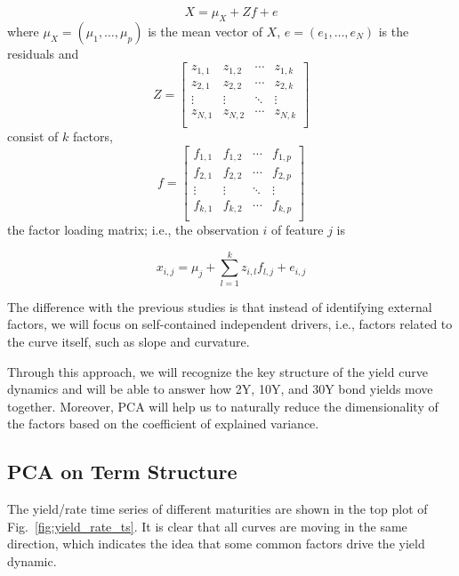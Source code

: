 \begin{equation}
X = \mu_ X + Zf + e
\end{equation}
\noindent
where $\mu_X = (\mu_1,\ldots, \mu_p)$ is the mean vector of $X$, $e = (e_1,\ldots, e_N )$ is the residuals and
\begin{equation}
Z =
\begin{bmatrix}
	z_{1,1} & z_{1,2} & \cdots & z_{1,k} \\
	z_{2,1} & z_{2,2} & \cdots & z_{2,k} \\
	\vdots & \vdots & \ddots & \vdots \\
	z_{N,1} & z_{N,2} & \cdots & z_{N,k} \\
\end{bmatrix}
\end{equation}
consist of $k$ factors,
\begin{equation}
f =
\begin{bmatrix}
	f_{1,1} & f_{1,2} & \cdots & f_{1,p} \\
	f_{2,1} & f_{2,2} & \cdots & f_{2,p} \\
	\vdots & \vdots & \ddots & \vdots \\
	f_{k,1} & f_{k,2} & \cdots & f_{k,p} \\
\end{bmatrix}
\end{equation}
the factor loading matrix; i.e., the observation $i$ of feature $j$ is

\begin{equation}
x_{i,j} = \mu_j + \sum_{l=1}^k z_{i,l}f_{l,j} + e_{i,j}
\end{equation}

The difference with the previous studies is that instead of identifying external factors, we will focus on self-contained independent drivers, i.e., factors related to the curve itself, such as slope and curvature.

Through this approach, we will recognize the key structure of the yield curve dynamics and will be able to answer how 2Y, 10Y, and 30Y bond yields move together. Moreover, PCA will help us to naturally reduce the dimensionality of the factors based on the coefficient of explained variance.

\subsection{PCA on Term Structure}

The yield/rate time series of different maturities are shown in the top plot of Fig.~\ref{fig:yield_rate_ts}. It is clear that all curves are moving in the same direction, which indicates the idea that some common factors drive the yield dynamic.

